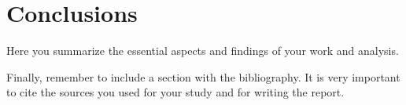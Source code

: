 \section{Conclusions}
Here you summarize the essential aspects and findings 
of your work and analysis.

Finally, remember to include a section with the bibliography.
It is very important to cite the sources you used for your study and
for writing the report.
